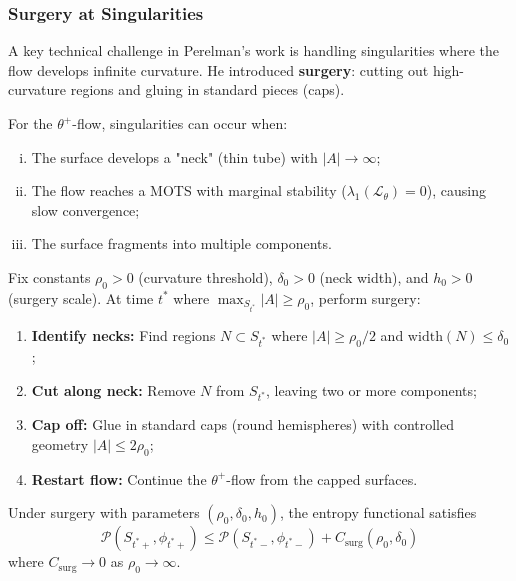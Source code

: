 \subsubsection{Surgery at Singularities}

A key technical challenge in Perelman's work is handling singularities where the flow develops infinite curvature. He introduced \textbf{surgery}: cutting out high-curvature regions and gluing in standard pieces (caps).

For the $\theta^+$-flow, singularities can occur when:
\begin{enumerate}[(i)]
\item The surface develops a "neck" (thin tube) with $|A| \to \infty$;
\item The flow reaches a MOTS with marginal stability ($\lambda_1(\mathcal{L}_\theta) = 0$), causing slow convergence;
\item The surface fragments into multiple components.
\end{enumerate}

\begin{definition}
\label{def:surgery}
Fix constants $\rho_0 > 0$ (curvature threshold), $\delta_0 > 0$ (neck width), and $h_0 > 0$ (surgery scale). At time $t^*$ where $\max_{S_{t^*}} |A| \geq \rho_0$, perform surgery:
\begin{enumerate}[\textbf{S1}.]
\item \textbf{Identify necks:} Find regions $N \subset S_{t^*}$ where $|A| \geq \rho_0/2$ and $\mathrm{width}(N) \leq \delta_0$;
\item \textbf{Cut along neck:} Remove $N$ from $S_{t^*}$, leaving two or more components;
\item \textbf{Cap off:} Glue in standard caps (round hemispheres) with controlled geometry $|A| \leq 2\rho_0$;
\item \textbf{Restart flow:} Continue the $\theta^+$-flow from the capped surfaces.
\end{enumerate}
\end{definition}

\begin{theorem}
\label{thm:surgery-entropy}
Under surgery with parameters $(\rho_0, \delta_0, h_0)$, the entropy functional satisfies
\begin{equation}
\mathcal{P}(S_{t^*+}, \phi_{t^*+}) \leq \mathcal{P}(S_{t^*-}, \phi_{t^*-}) + C_{\mathrm{surg}}(\rho_0, \delta_0)
\end{equation}
where $C_{\mathrm{surg}} \to 0$ as $\rho_0 \to \infty$.
\end{theorem}

